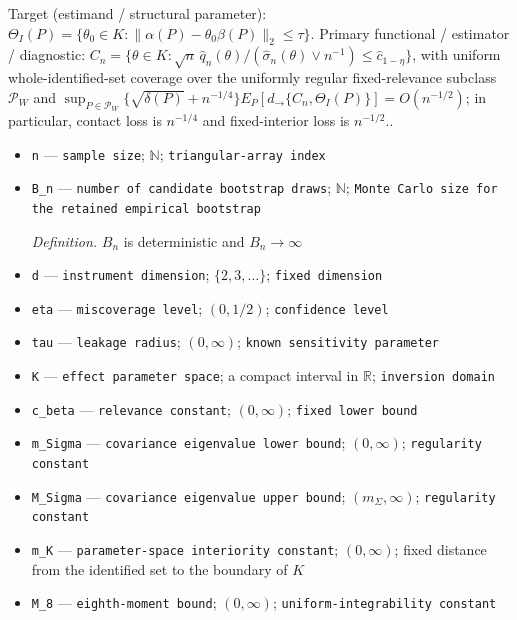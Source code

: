 \documentclass{article}
\begin{document}
Target (estimand / structural parameter): \(\Theta_I(P)=\{\theta_0\in K:\|\alpha(P)-\theta_0\beta(P)\|_2\leq\tau\}\).
Primary functional / estimator / diagnostic: \(C_n=\{\theta\in K:\sqrt n\,\widehat q_n(\theta)/(\widehat\sigma_n(\theta)\vee n^{-1})\leq\widehat c_{1-\eta}\}\), with uniform whole-identified-set coverage over the uniformly regular fixed-relevance subclass \(\mathcal P_W\) and \(\sup_{P\in\mathcal P_W}\{\sqrt{\delta(P)}+n^{-1/4}\}E_P[d_{\to}\{C_n,\Theta_I(P)\}]=O(n^{-1/2})\); in particular, contact loss is \(n^{-1/4}\) and fixed-interior loss is \(n^{-1/2}\)..
\begin{itemize}
  \item \texttt{n} --- \texttt{sample size}; \(\mathbb N\); \texttt{triangular-\allowbreak{}array index}
  \item \texttt{B\_\allowbreak{}n} --- \texttt{number of candidate bootstrap draws}; \(\mathbb N\); \texttt{Monte Carlo size for the retained empirical bootstrap}
  \par\smallskip\noindent\emph{Definition.} \(B_n\) is deterministic and \(B_n\to\infty\)
  \item \texttt{d} --- \texttt{instrument dimension}; \(\{2,3,\ldots\}\); \texttt{fixed dimension}
  \item \texttt{eta} --- \texttt{miscoverage level}; \((0,1/2)\); \texttt{confidence level}
  \item \texttt{tau} --- \texttt{leakage radius}; \((0,\infty)\); \texttt{known sensitivity parameter}
  \item \texttt{K} --- \texttt{effect parameter space}; a compact interval in \(\mathbb R\); \texttt{inversion domain}
  \item \texttt{c\_\allowbreak{}beta} --- \texttt{relevance constant}; \((0,\infty)\); \texttt{fixed lower bound}
  \item \texttt{m\_\allowbreak{}Sigma} --- \texttt{covariance eigenvalue lower bound}; \((0,\infty)\); \texttt{regularity constant}
  \item \texttt{M\_\allowbreak{}Sigma} --- \texttt{covariance eigenvalue upper bound}; \((m_{\Sigma},\infty)\); \texttt{regularity constant}
  \item \texttt{m\_\allowbreak{}K} --- \texttt{parameter-\allowbreak{}space interiority constant}; \((0,\infty)\); fixed distance from the identified set to the boundary of \(K\)
  \item \texttt{M\_\allowbreak{}8} --- \texttt{eighth-\allowbreak{}moment bound}; \((0,\infty)\); \texttt{uniform-\allowbreak{}integrability constant}

\end{itemize}
\end{document}
